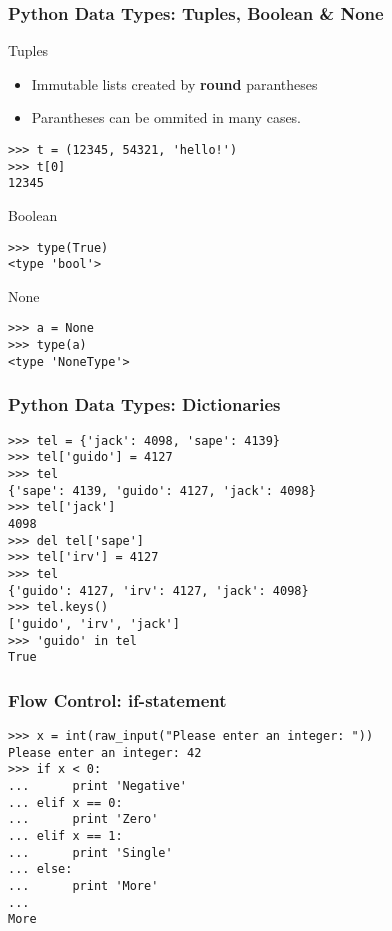 \begin{frame}[fragile]
    \frametitle{Python Data Types: Tuples, Boolean \& None}
    Tuples
    \begin{itemize}
        \item Immutable lists created by \textbf{round} parantheses
        \item Parantheses can be ommited in many cases.
    \end{itemize}
    \begin{myColorBox}{0.9}{}
\begin{verbatim}
>>> t = (12345, 54321, 'hello!')
>>> t[0]
12345
\end{verbatim}
    \end{myColorBox}
\pause
Boolean
        \begin{myColorBox}{0.9}{}
\begin{verbatim}
>>> type(True)
<type 'bool'>
\end{verbatim}
    \end{myColorBox}
\pause
None
        \begin{myColorBox}{0.9}{}
\begin{verbatim}
>>> a = None
>>> type(a)
<type 'NoneType'>
\end{verbatim}
    \end{myColorBox}
\pause

\end{frame}

\begin{frame}[fragile]
    \frametitle{Python Data Types: Dictionaries}
    \begin{myColorBox}{0.9}{}
\begin{verbatim}
>>> tel = {'jack': 4098, 'sape': 4139}
>>> tel['guido'] = 4127
>>> tel
{'sape': 4139, 'guido': 4127, 'jack': 4098}
>>> tel['jack']
4098
>>> del tel['sape']
>>> tel['irv'] = 4127
>>> tel
{'guido': 4127, 'irv': 4127, 'jack': 4098}
>>> tel.keys()
['guido', 'irv', 'jack']
>>> 'guido' in tel
True
\end{verbatim}
    \end{myColorBox}
\end{frame}

\begin{frame}[fragile]
    \frametitle{Flow Control: if-statement}
    \begin{myColorBox}{0.9}{}
\begin{verbatim}
>>> x = int(raw_input("Please enter an integer: "))
Please enter an integer: 42
>>> if x < 0:
...      print 'Negative'
... elif x == 0:
...      print 'Zero'
... elif x == 1:
...      print 'Single'
... else:
...      print 'More'
...
More
\end{verbatim}
    \end{myColorBox}
\end{frame}


